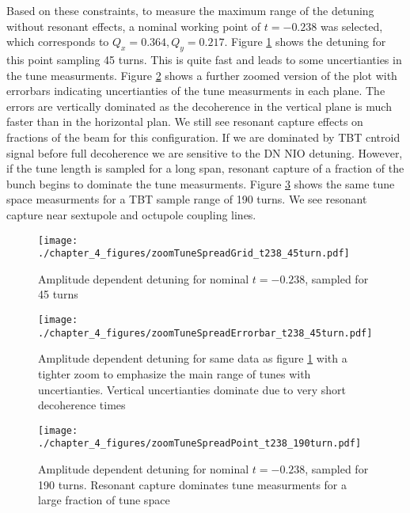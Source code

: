 Based on these constraints, to measure the maximum range of the detuning without resonant effects, a nominal working point of $t=-0.238$ was selected, which corresponds to $Q_x = 0.364, Q_y = 0.217$. Figure \ref{fig:t238detune45} shows the detuning for this point sampling 45 turns. This is quite fast and leads to some uncertianties in the tune measurments. Figure \ref{fig:t238detune45Error} shows a further zoomed version of the plot with errorbars indicating uncertianties of the tune measurments in each plane. The errors are vertically dominated as the decoherence in the vertical plane is much faster than in the horizontal plan. We still see resonant capture effects on fractions of the beam for this configuration. If we are dominated by TBT cntroid signal before full decoherence we are sensitive to the DN NIO detuning. However, if the tune length is sampled for a long span, resonant capture of a fraction of the bunch begins to dominate the tune measurments. Figure \ref{fig:t238detune190} shows the same tune space measurments for a TBT sample range of 190 turns. We see resonant capture near sextupole and octupole coupling lines.

\begin{figure}
	\centering
	\texttt{[image: ./chapter\_4\_figures/zoomTuneSpreadGrid\_t238\_45turn.pdf]}
	\caption{Amplitude dependent detuning for nominal $t=-0.238$, sampled for 45 turns}
	\label{fig:t238detune45}
\end{figure}


\begin{figure}
	\centering
	\texttt{[image: ./chapter\_4\_figures/zoomTuneSpreadErrorbar\_t238\_45turn.pdf]}
	\caption{Amplitude dependent detuning for same data as figure \ref{fig:t238detune45} with a tighter zoom to emphasize the main range of tunes with uncertianties. Vertical uncertianties dominate due to very short decoherence times}
	\label{fig:t238detune45Error}
\end{figure}

\begin{figure}
	\centering
	\texttt{[image: ./chapter\_4\_figures/zoomTuneSpreadPoint\_t238\_190turn.pdf]}
	\caption{Amplitude dependent detuning for nominal $t=-0.238$, sampled for 190 turns. Resonant capture dominates tune measurments for a large fraction of tune space}
	\label{fig:t238detune190}
\end{figure}


